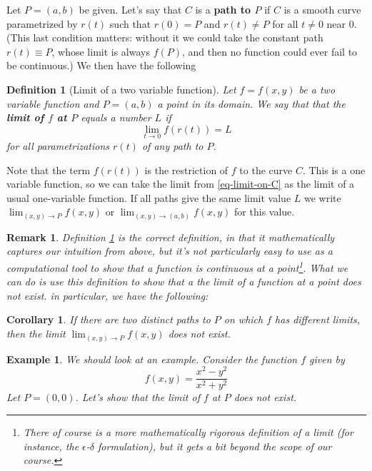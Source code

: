 \documentclass[12pt]{article}
\numberwithin{equation}{subsection}
\numberwithin{figure}{subsection}
\newtheorem{defn}[subsection]{Definition}
\newtheorem{corr}[subsection]{Corollary}
\theoremstyle{note}
\newtheorem{example}[subsection]{Example}
\newtheorem{remark}[subsection]{Remark}
\begin{document}
{Let $P=(a,b)$ be given. Let's say that $C$ is a \textbf{path to $P$} if $C$ is a smooth curve parametrized by $r(t)$ such that $r(0)=P$ and $r(t)\neq P$ for all $t\neq 0$ near $0$. (This last condition matters: without it we could take the constant path $r(t)\equiv P$, whose limit is always $f(P)$, and then no function could ever fail to be continuous.) We then have the following

\begin{defn}[Limit of a two variable function] \label{def-limit}
	Let $f=f(x,y)$ be a two variable function and $P=(a,b)$ a point in its domain. We say that that the \textbf{limit of $f$ at $P$} equals a number $L$ if \begin{equation} \label{eq-limit-on-C} \lim_{t\to 0} f(r(t))=L\end{equation}for all parametrizations $r(t)$  of any path to $P$.
\end{defn}
Note that the term $f(r(t))$ is the restriction of $f$ to the curve $C$. This is a one variable function, so we can take the limit from \eqref{eq-limit-on-C} as the limit of a usual one-variable function. If all paths give the same limit value $L$ we write $\displaystyle \lim_{(x,y)\to P} f(x,y)$ or $\displaystyle \lim_{(x,y)\to (a,b)} f(x,y)$   for this value. 

\begin{remark}
	Definition \ref{def-limit} is the \textit{correct} definition, in that it mathematically captures our intuition from above, but it's not particularly easy to \textit{use} as a computational tool to show that a function is continuous at a point\footnote{There of course is a more mathematically rigorous definition of a limit (for instance, the $\epsilon$-$\delta$ formulation), but it gets a bit beyond the scope of our course.}. What we can do is  use this definition to show that a the limit of a function at a point does \textit{not} exist. in particular, we have the following:

\end{remark}

\begin{corr}
	If there are two distinct paths to $P$ on which $f$ has different limits, then the limit $\displaystyle \lim_{(x,y)\to P} f(x,y)$ does not exist.
\end{corr}

\begin{example}
	We should look at an example. Consider the function $f$ given by \[ f(x,y)=\dfrac{x^2-y^2}{x^2+y^2}\] Let $P=(0,0)$. Let's show that the limit of $f$ at $P$ does not exist. 
	

\end{example}}
\end{document}

